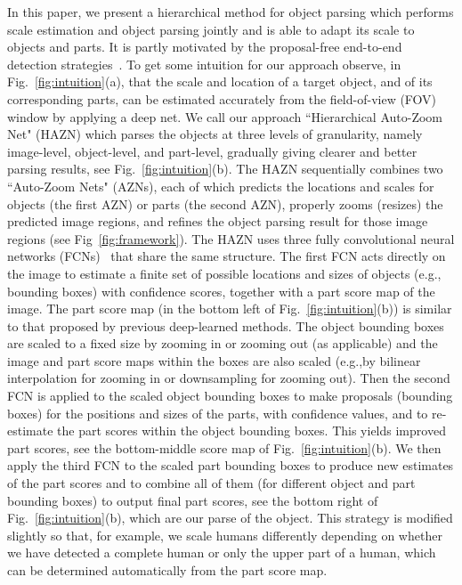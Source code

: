 \documentclass[runningheads]{llncs}
\begin{document}
In this paper, we present a hierarchical method for object parsing which performs scale estimation and object parsing jointly and is able to adapt its scale to objects and parts. It is partly motivated by the proposal-free end-to-end detection strategies~\cite{huang2015densebox,ren2015faster,DBLP:journals/corr/RedmonDGF15,DBLP:journals/corr/LiangWSYLY15}.
To get some intuition for our approach observe, in Fig.~\ref{fig:intuition}(a), that the scale and location of a target object, and of its corresponding parts, can be estimated accurately from the field-of-view (FOV) window by applying a deep net.
We call our approach ``Hierarchical Auto-Zoom Net" (HAZN) which parses the objects at three levels of granularity, namely image-level, object-level, and part-level, gradually giving clearer and better parsing results, see Fig.~\ref{fig:intuition}(b). The HAZN sequentially combines two ``Auto-Zoom Nets" (AZNs), each of which predicts the locations and scales for objects (the first AZN) or parts (the second AZN), properly zooms (resizes) the predicted image regions, and refines the object parsing result for those image regions (see Fig~\ref{fig:framework}). The HAZN uses three fully convolutional neural networks (FCNs)~\cite{long2014fully} that share the same structure. The first FCN acts directly on the image to estimate a finite set of possible locations and sizes of objects (e.g., bounding boxes) with confidence scores, together with a part score map of the image. The part score map (in the bottom left of Fig.~\ref{fig:intuition}(b)) is similar to that proposed by previous deep-learned methods. The object bounding boxes are scaled to a fixed size by zooming in or zooming out (as applicable) and the image and part score maps within the boxes are also scaled (e.g.,by bilinear interpolation for zooming in or downsampling for zooming out). Then the second FCN is applied to the scaled object bounding boxes to make proposals (bounding boxes) for the positions and sizes of the parts, with confidence values, and to re-estimate the part scores within the object bounding boxes. This yields improved part scores, see the bottom-middle score map of Fig.~\ref{fig:intuition}(b). We then apply the third FCN to the scaled part bounding boxes to produce new estimates of the part scores and to combine all of them (for different object and part bounding boxes) to output final part scores, see the bottom right of Fig.~\ref{fig:intuition}(b), which are our parse of the object. This strategy is modified slightly so that, for example, we scale humans differently depending on whether we have detected a complete human or only the upper part of a human, which can be determined automatically from the part score map.
\end{document}
